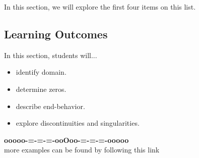 \documentclass{ximera}
\begin{document}
In this section, we will explore the first four items on this list.









\subsection{Learning Outcomes}

\begin{sectionOutcomes}
In this section, students will...

\begin{itemize}
\item identify domain.
\item determine zeros.
\item describe end-behavior.
\item explore discontinuities and singularities.
\end{itemize}
\end{sectionOutcomes}





















\begin{center}
\textbf{\textcolor{green!50!black}{ooooo-=-=-=-ooOoo-=-=-=-ooooo}} \\

more examples can be found by following this link\\ 

\end{center}
\end{document}
